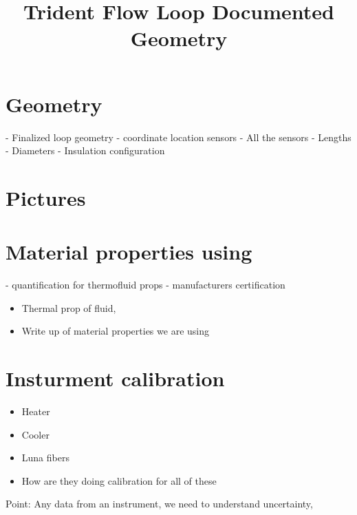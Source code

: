 \documentclass{article}
\title{Trident Flow Loop Documented Geometry}
\begin{document}
\maketitle

\section{Geometry}
- Finalized loop geometry
- coordinate location sensors
  - All the sensors
- Lengths
- Diameters
- Insulation configuration


\section{Pictures}


\section{Material properties using}
- quantification for thermofluid props
- manufacturers certification
\begin{itemize}
    \item Thermal prop of fluid, 
    \item Write up of material properties we are using
\end{itemize}

\section{Insturment calibration}
\begin{itemize}
    \item Heater
    \item Cooler 
    \item Luna fibers
    \item How are they doing calibration for all of these
\end{itemize}

Point: Any data from an instrument, we need to understand uncertainty, 
\end{document}
